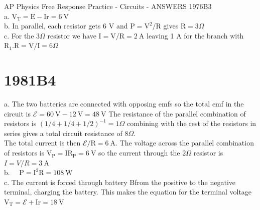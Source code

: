 \begin{enumerate}
AP Physics Free Response Practice - Circuits - ANSWERS 1976B3\\
a. $\mathrm{V}_{\mathrm{T}}=\mathrm{E}-\mathrm{Ir}=6 \mathrm{~V}$\\
b. In parallel, each resistor gets 6 V and $\mathrm{P}=\mathrm{V}^{2} / \mathrm{R}$ gives $\mathrm{R}=3 \Omega$\\
c. For the $3 \Omega$ resistor we have $\mathrm{I}=\mathrm{V} / \mathrm{R}=2 \mathrm{~A}$ leaving 1 A for the branch with $\mathrm{R}_{1} . \mathrm{R}=\mathrm{V} / \mathrm{I}=6 \Omega$

\section*{1981B4}
a. The two batteries are connected with opposing emfs so the total emf in the circuit is $\boldsymbol{\mathcal { E }}=60 \mathrm{~V}-12 \mathrm{~V}=48 \mathrm{~V}$ The resistance of the parallel combination of resistors is $(1 / 4+1 / 4+1 / 2)^{-1}=1 \Omega$ combining with the rest of the resistors in series gives a total circuit resistance of $8 \Omega$.\\
The total current is then $\boldsymbol{\mathcal { E }} / \mathrm{R}=6 \mathrm{~A}$. The voltage across the parallel combination of resistors is $\mathrm{V}_{\mathrm{P}}=\mathrm{IR}_{\mathrm{P}}=6 \mathrm{~V}$ so the current through the $2 \Omega$ resistor is $I=V / R=3 \mathrm{~A}$\\
b. $\quad \mathrm{P}=\mathrm{I}^{2} \mathrm{R}=108 \mathrm{~W}$\\
c. The current is forced through battery Bfrom the positive to the negative terminal, charging the battery. This makes the equation for the terminal voltage $\mathrm{V}_{\mathrm{T}}=\boldsymbol{\mathcal { E }}+\mathrm{Ir}=18 \mathrm{~V}$


\end{enumerate}

